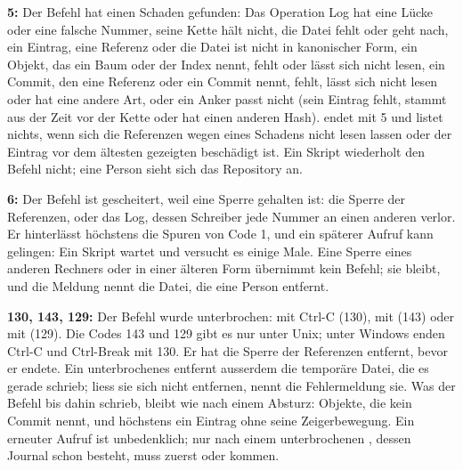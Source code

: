 \item {\bf 5:} Der Befehl hat einen Schaden gefunden: Das Operation Log hat eine Lücke
oder eine falsche Nummer, seine Kette hält nicht, die Datei  fehlt oder
geht nach, ein Eintrag, eine Referenz oder die Datei  ist nicht
in kanonischer Form, ein Objekt, das ein Baum oder der Index nennt, fehlt oder lässt sich nicht
lesen, ein Commit, den eine Referenz oder ein Commit nennt, fehlt, lässt sich nicht lesen
oder hat eine andere Art, oder ein Anker passt nicht
(sein Eintrag fehlt, stammt aus der Zeit vor der Kette oder hat einen anderen Hash).
 endet mit 5 und listet nichts, wenn sich die Referenzen wegen eines Schadens nicht
lesen lassen oder der Eintrag vor dem ältesten gezeigten beschädigt ist.
Ein Skript wiederholt den Befehl nicht; eine Person sieht sich das Repository an.
\item {\bf 6:} Der Befehl ist gescheitert, weil eine Sperre gehalten ist: die Sperre der
Referenzen, oder das Log, dessen Schreiber jede Nummer an einen anderen verlor.
Er hinterlässt höchstens die Spuren von Code 1, und ein späterer Aufruf kann gelingen:
Ein Skript wartet und versucht es einige Male.
Eine Sperre eines anderen Rechners oder in einer älteren Form übernimmt kein Befehl;
sie bleibt, und die Meldung nennt die Datei, die eine Person entfernt.
\item {\bf 130, 143, 129:} Der Befehl wurde unterbrochen: mit Ctrl-C (130),
mit  (143) oder mit  (129).
Die Codes 143 und 129 gibt es nur unter Unix;
unter Windows enden Ctrl-C und Ctrl-Break mit 130.
Er hat die Sperre der Referenzen entfernt, bevor er endete.
Ein unterbrochenes  entfernt ausserdem die temporäre Datei, die es gerade
schrieb; liess sie sich nicht entfernen, nennt die Fehlermeldung sie.
Was der Befehl bis dahin schrieb, bleibt wie nach einem Absturz: Objekte, die kein Commit nennt,
und höchstens ein Eintrag ohne seine Zeigerbewegung. Ein erneuter Aufruf ist unbedenklich;
nur nach einem unterbrochenen ,
dessen Journal schon besteht, muss zuerst  oder  kommen.
\stopitemize


